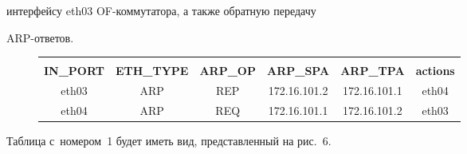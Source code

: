интерфейсу eth03 OF-ком\-му\-та\-то\-ра, а также обратную передачу  


ARP-от\-ве\-тов.


  


  \begin{figure} %


  \begin{center}


  {\footnotesize


  {\sf \begin{tabular}{|c|c|c|c|c|c|}


  \hline


  &&&&&\\[-9pt]


  \textbf{IN\_PORT} &   \textbf{ETH\_TYPE}& 


    \textbf{ARP\_OP}&   \textbf{ARP\_SPA} &   \textbf{ARP\_TPA} &   \textbf{actions}\\


  \hline


  eth03& ARP & REP & 172.16.101.2& 172.16.101.1 & eth04\\


  eth04& ARP & REQ & 172.16.101.1& 172.16.101.2 & eth03\\


  \hline


  \end{tabular}}}


  \end{center}


  


  \vspace*{-9pt}


  




  \end{figure}


  


  Таблица с~номером~1 будет иметь вид, представленный на рис.~6.


  





